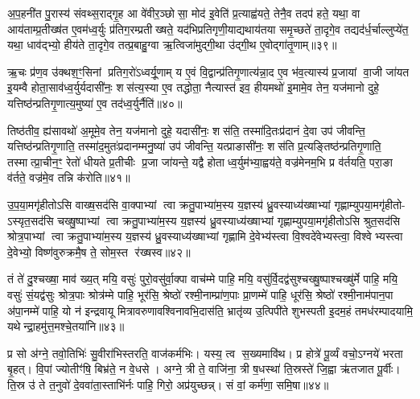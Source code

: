 अ॒प॒हनी॑त पु॒रास्य॑ संवथ्स॒राद्गृ॒ह आ वे॑वीर॒ञ्छोसा॒ मोद॑ इ॒वेति॑ प्र॒त्याह्व॑यते॒ तेनै॒व तदप॑ हते॒ यथा॒ वा आय॑ताम्प्र॒तीख्ष॑त ए॒वम॑ध्व॒र्युः प्र॑तिग॒रम्प्रतीख्षते॒ यद॑भिप्रतिगृणी॒याद्यथाय॑तया समृ॒च्छते॑ ता॒दृगे॒व तद्यद॑र्ध॒र्चाल्लुप्ये॑त॒ यथा॒ धाव॑द्भ्यो॒ हीय॑ते ता॒दृगे॒व तत्प्र॒बाहु॒ग्वा ऋ॒त्विजा॑मुद्गी॒था उ॑द्गी॒थ ए॒वोद्गा॑तृ॒णाम्॥३९॥

ऋ॒चः प्र॑ण॒व उ॑क्थश॒ꣳ॒सिनां प्रतिग॒रो॑ऽध्वर्यू॒णाम् य ए॒वं वि॒द्वान्प्र॑तिगृ॒णात्य॑न्ना॒द ए॒व भ॑व॒त्यास्य॑ प्र॒जायां वा॒जी जा॑यत इ॒यम्वै होता॒साव॑ध्व॒र्युर्यदासी॑नः॒ शस॑त्य॒स्या ए॒व तद्धोता॒ नैत्यास्त॑ इव॒ हीयमथो॑ इ॒मामे॒व तेन॒ यज॑मानो दुहे॒ यत्तिष्ठ॑न्प्रतिगृ॒णात्य॒मुष्या॑ ए॒व तद॑ध्व॒र्युर्नैति॑॥४०॥

तिष्ठ॑तीव॒ ह्य॑सावथो॑ अ॒मूमे॒व तेन॒ यज॑मानो दुहे॒ यदासी॑नः॒ शस॑ति॒ तस्मा॑दि॒तःप्र॑दानं दे॒वा उप॑ जीवन्ति॒ यत्तिष्ठ॑न्प्रतिगृ॒णाति॒ तस्मा॑द॒मुतः॑प्रदानम्मनु॒ष्या॑ उप॑ जीवन्ति॒ यत्प्राङासी॑नः॒ शस॑ति प्र॒त्यङ्तिष्ठ॑न्प्रतिगृ॒णाति॒ तस्मात्प्रा॒चीन॒ꣳ॒ रेतो॑ धीयते प्र॒तीचीः प्र॒जा जा॑यन्ते॒ यद्वै होताध्व॒र्युम॑भ्या॒ह्वय॑ते॒ वज्र॑मेनम॒भि प्र व॑र्तयति॒ परा॒ङा व॑र्तते॒ वज्र॑मे॒व तन्नि क॑रोति॥४१॥

{\anuvakamend[{सव॑ने॒ वज्र॑म॒न्तर्ध॑त्ते॒ त्रीण्ये॒तान्य॒क्षरा॑णीन्द्रि॒यम्माध्य॑न्दिन॒ꣳ॒ सव॑न॒न्नोद्गा॑तृ॒णाम॑ध्व॒र्युर्नैति॑ वर्तयत्य॒ष्टौ च॑॥९॥}]}

उ॒प॒या॒मगृ॑हीतोऽसि वाख्ष॒सद॑सि वा॒क्पाभ्यां त्वा क्रतु॒पाभ्या॑म॒स्य य॒ज्ञस्य॑ ध्रु॒वस्याध्य॑ख्षाभ्यां गृह्णाम्युपया॒मगृ॑हीतो- ऽस्यृत॒सद॑सि चख्षु॒ष्पाभ्यां त्वा क्रतु॒पाभ्या॑म॒स्य य॒ज्ञस्य॑ ध्रु॒वस्याध्य॑ख्षाभ्यां गृह्णाम्युपया॒मगृ॑हीतोऽसि श्रुत॒सद॑सि श्रोत्र॒पाभ्यां त्वा क्रतु॒पाभ्या॑म॒स्य य॒ज्ञस्य॑ ध्रु॒वस्याध्य॑ख्षाभ्यां गृह्णामि दे॒वेभ्य॑स्त्वा वि॒श्वदे॑वेभ्यस्त्वा॒ विश्वेभ्यस्त्वा दे॒वेभ्यो॒ विष्ण॑वुरुक्रमै॒ष ते॒ सोम॒स्त र॑ख्षस्व॥४२॥

तं ते॑ दु॒श्चख्षा॒ माव॑ ख्य॒त् मयि॒ वसुः॑ पुरो॒वसु॑र्वा॒क्पा वाच॑म्मे पाहि॒ मयि॒ वसु॑र्वि॒दद्व॑सुश्चख्षु॒ष्पाश्चख्षु॑र्मे पाहि॒ मयि॒ वसुः॑ सं॒यद्व॑सुः श्रोत्र॒पाः श्रोत्र॑म्मे पाहि॒ भूर॑सि॒ श्रेष्ठो॑ रश्मी॒नाम्प्रा॑ण॒पाः प्रा॒णम्मे॑ पाहि॒ धूर॑सि॒ श्रेष्ठो॑ रश्मी॒नाम॑पान॒पा अ॑पा॒नम्मे॑ पाहि॒ यो न॑ इन्द्रवायू मित्रावरुणावश्विनावभि॒दास॑ति॒ भ्रातृ॑व्य उ॒त्पिपी॑ते शुभस्पती इ॒दम॒हं तमध॑रम्पादयामि॒ यथेन्द्रा॒हमु॑त्त॒मश्चे॒तया॑नि॥४३॥

{\anuvakamend[{र॒क्ष॒स्व॒ भ्रातृ॑व्य॒स्त्रयो॑दश च॥10॥}]}

प्र सो अ॑ग्ने॒ तवो॒तिभिः॑ सु॒वीरा॑भिस्तरति॒ वाज॑कर्मभिः। यस्य॒ त्व स॒ख्यमावि॑थ। प्र होत्रे॑ पू॒र्व्यं वचो॒ऽग्नये॑ भरता बृ॒हत्। वि॒पां ज्योतीꣳ॑षि॒ बिभ्र॑ते॒ न वे॒धसे। अग्ने॒ त्री ते॒ वाजि॑ना॒ त्री ष॒धस्था॑ ति॒स्रस्ते॑ जि॒ह्वा ऋ॑तजात पू॒र्वीः। ति॒स्र उ॑ ते त॒नुवो॑ दे॒ववा॑ता॒स्ताभि॑र्नः पाहि॒ गिरो॒ अप्र॑युच्छन्न्। सं वां॒ कर्म॑णा॒ समि॒षा॥४४॥


